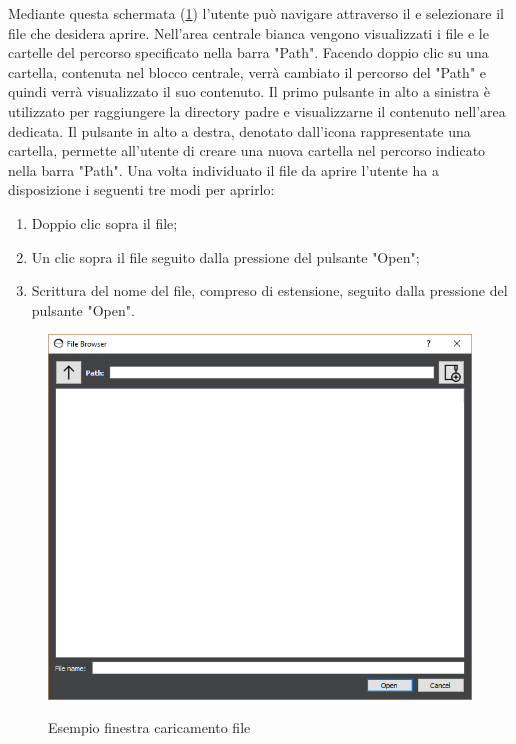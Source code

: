 \documentclass[../AnalisideiRequisiti.tex]{subfiles}
\begin{document}
		Mediante questa schermata (\ref{fig:filebrowser-load}) l'utente può navigare attraverso il  e selezionare il file che desidera aprire. 
		Nell'area centrale bianca vengono visualizzati i file e le cartelle del percorso specificato nella barra "Path". Facendo doppio clic su una cartella, contenuta nel blocco centrale, verrà cambiato il percorso del "Path" e quindi verrà visualizzato il suo contenuto.
		Il primo pulsante in alto a sinistra è utilizzato per raggiungere la directory padre e visualizzarne il contenuto nell'area dedicata.
		Il pulsante in alto a destra, denotato dall'icona rappresentate una cartella, permette all'utente di creare una nuova cartella nel percorso indicato nella barra "Path". 
		Una volta individuato il file da aprire l'utente ha a disposizione i seguenti tre modi per aprirlo:
		\begin{enumerate}
			\item{} Doppio clic sopra il file;
			\item{} Un clic sopra il file seguito dalla pressione del pulsante "Open";
			\item{} Scrittura del nome del file, compreso di estensione, seguito dalla pressione del pulsante "Open".
		\end{enumerate}
		\begin{figure}[htp]
			\caption{Esempio finestra caricamento file}
			\centering
			\includegraphics[width=\textwidth]{../img/filebrowser-load.png}
			\label{fig:filebrowser-load}
		\end{figure}
\end{document}
